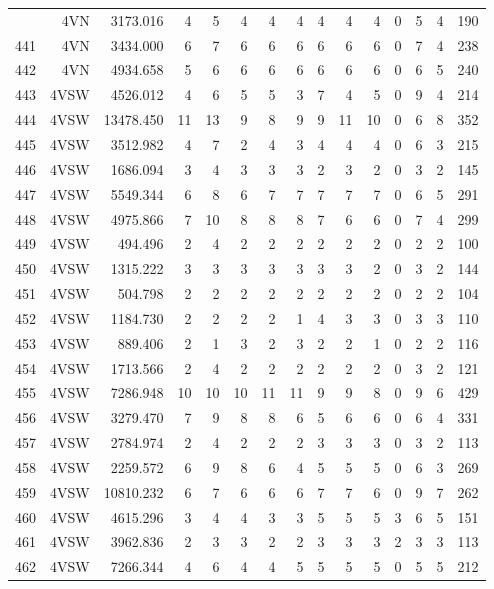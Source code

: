 \documentclass[12pt]{article}\usepackage[]{graphicx}\usepackage[]{color}
\begin{document}
\begin{landscapepage}
\begin{longtable}[t]{crrrrrrrrrrrrrr}
\endfoot
\bottomrule
\endlastfoot
440 & 4VN & 3173.016 & 4 & 5 & 4 & 4 & 4 & 4 & 4 & 4 & 0 & 5 & 4 & 190\\
441 & 4VN & 3434.000 & 6 & 7 & 6 & 6 & 6 & 6 & 6 & 6 & 0 & 7 & 4 & 238\\
442 & 4VN & 4934.658 & 5 & 6 & 6 & 6 & 6 & 6 & 6 & 6 & 0 & 6 & 5 & 240\\
443 & 4VSW & 4526.012 & 4 & 6 & 5 & 5 & 3 & 7 & 4 & 5 & 0 & 9 & 4 & 214\\
444 & 4VSW & 13478.450 & 11 & 13 & 9 & 8 & 9 & 9 & 11 & 10 & 0 & 6 & 8 & 352\\
445 & 4VSW & 3512.982 & 4 & 7 & 2 & 4 & 3 & 4 & 4 & 4 & 0 & 6 & 3 & 215\\
446 & 4VSW & 1686.094 & 3 & 4 & 3 & 3 & 3 & 2 & 3 & 2 & 0 & 3 & 2 & 145\\
447 & 4VSW & 5549.344 & 6 & 8 & 6 & 7 & 7 & 7 & 7 & 7 & 0 & 6 & 5 & 291\\
448 & 4VSW & 4975.866 & 7 & 10 & 8 & 8 & 8 & 7 & 6 & 6 & 0 & 7 & 4 & 299\\
449 & 4VSW & 494.496 & 2 & 4 & 2 & 2 & 2 & 2 & 2 & 2 & 0 & 2 & 2 & 100\\
450 & 4VSW & 1315.222 & 3 & 3 & 3 & 3 & 3 & 3 & 3 & 2 & 0 & 3 & 2 & 144\\
451 & 4VSW & 504.798 & 2 & 2 & 2 & 2 & 2 & 2 & 2 & 2 & 0 & 2 & 2 & 104\\
452 & 4VSW & 1184.730 & 2 & 2 & 2 & 2 & 1 & 4 & 3 & 3 & 0 & 3 & 3 & 110\\
453 & 4VSW & 889.406 & 2 & 1 & 3 & 2 & 3 & 2 & 2 & 1 & 0 & 2 & 2 & 116\\
454 & 4VSW & 1713.566 & 2 & 4 & 2 & 2 & 2 & 2 & 2 & 2 & 0 & 3 & 2 & 121\\
455 & 4VSW & 7286.948 & 10 & 10 & 10 & 11 & 11 & 9 & 9 & 8 & 0 & 9 & 6 & 429\\
456 & 4VSW & 3279.470 & 7 & 9 & 8 & 8 & 6 & 5 & 6 & 6 & 0 & 6 & 4 & 331\\
457 & 4VSW & 2784.974 & 2 & 4 & 2 & 2 & 2 & 3 & 3 & 3 & 0 & 3 & 2 & 113\\
458 & 4VSW & 2259.572 & 6 & 9 & 8 & 6 & 4 & 5 & 5 & 5 & 0 & 6 & 3 & 269\\
459 & 4VSW & 10810.232 & 6 & 7 & 6 & 6 & 6 & 7 & 7 & 6 & 0 & 9 & 7 & 262\\
460 & 4VSW & 4615.296 & 3 & 4 & 4 & 3 & 3 & 5 & 5 & 5 & 3 & 6 & 5 & 151\\
461 & 4VSW & 3962.836 & 2 & 3 & 3 & 2 & 2 & 3 & 3 & 3 & 2 & 3 & 3 & 113\\
462 & 4VSW & 7266.344 & 4 & 6 & 4 & 4 & 5 & 5 & 5 & 5 & 0 & 5 & 5 & 212\\

\end{longtable}
\end{landscapepage}
\end{document}
